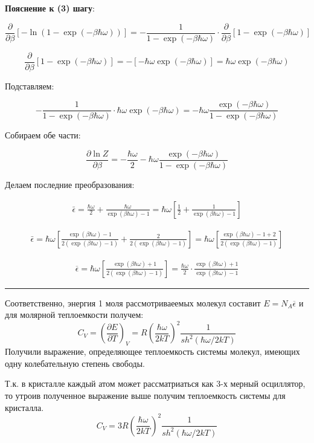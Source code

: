 \documentclass[a4paper]{article}
\begin{document}
\textbf{ Пояснение к (3) шагу}:

\[
\frac{\partial}{\partial \beta} \left[ - \ln(1 - \exp(-\beta \hbar \omega)) \right] = -\frac{1}{1 - \exp(-\beta \hbar \omega)} \cdot \frac{\partial}{\partial \beta} \left[ 1 - \exp(-\beta \hbar \omega) \right]
\]

\[
\frac{\partial}{\partial \beta} \left[ 1 - \exp(-\beta \hbar \omega) \right] = -[-\hbar \omega \exp(-\beta \hbar \omega)] = \hbar \omega \exp(-\beta \hbar \omega)
\]

Подставляем:

\[
- \frac{1}{1 - \exp(-\beta \hbar \omega)} \cdot \hbar \omega \exp(-\beta \hbar \omega) = -\hbar \omega \frac{\exp(-\beta \hbar \omega)}{1 - \exp(-\beta \hbar \omega)}
\]

Собираем обе части:

\[
\frac{\partial \ln Z}{\partial \beta} = -\frac{\hbar \omega}{2} - \hbar \omega \frac{\exp(-\beta \hbar \omega)}{1 - \exp(-\beta \hbar \omega)}
\]

Делаем последние преобразования:

\begin{align*}
\bar{\epsilon} = \frac{\hbar\omega}{2} + \frac{\hbar\omega}{\exp(\beta\hbar\omega) - 1} = \hbar\omega\left[\frac{1}{2} + \frac{1}{\exp(\beta\hbar\omega) - 1}\right]
\end{align*}

\begin{align*}
\bar{\epsilon}=\hbar\omega\left[\frac{\exp(\beta\hbar\omega)-1}{2(\exp(\beta\hbar\omega)-1)}+\frac{2}{2(\exp(\beta\hbar\omega)-1)}\right]=\hbar\omega\left[\frac{\exp(\beta\hbar\omega)-1+2}{2(\exp(\beta\hbar\omega)-1)}\right]
\end{align*}

\begin{align*}
\overline{\epsilon}=\hbar\omega\left[\frac{\exp(\beta\hbar\omega)+1}{2(\exp(\beta\hbar\omega)-1)}\right]=\frac{\hbar\omega}{2}\cdot\frac{\exp(\beta\hbar\omega)+1}{\exp(\beta\hbar\omega)-1}
\end{align*}

\rule{0.5\linewidth}{0.4pt}

Соответственно, энергия 1 моля рассмотриваеемых молекул составит $E = N_{A}\overline{\epsilon} $ и для молярной теплоемкости 
получем:
\[C_{V} = (\frac{\partial E}{\partial T})_{V} = R(\frac{\hbar \omega}{2kT})^{2}\frac{1}{sh^{2}(\hbar \omega/2kT)}\]
Получили выражение, определяющее теплоемкость системы молекул, имеющих одну колебательную степень свободы.\par
Т.к. в кристалле каждый атом может рассматриаться как 3-х мерный осциллятор, то утроив полученное выражение выше получим теплоемкость системы для кристалла.
\[C_{V} = 3R(\frac{\hbar \omega}{2kT})^{2}\frac{1}{sh^{2}(\hbar \omega/2kT)}\]
\end{document}
